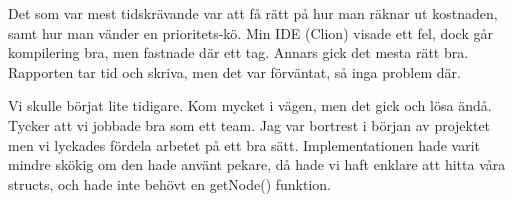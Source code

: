 \documentclass[fleqn,10pt]{article}
\begin{document}
Det som var mest tidskrävande var att få rätt på hur man räknar ut kostnaden, samt hur man vänder en prioritets-kö. Min IDE (Clion) visade ett fel, dock går kompilering bra, men fastnade där ett tag. Annars gick det mesta rätt bra. Rapporten tar tid och skriva, men det var förväntat, så inga problem där.

Vi skulle börjat lite tidigare. Kom mycket i vägen, men det gick och lösa ändå. Tycker att vi jobbade bra som ett team. Jag var bortrest i början av projektet men vi lyckades fördela arbetet på ett bra sätt. Implementationen hade varit mindre skökig om den hade använt pekare, då hade vi haft enklare att hitta våra structs, och hade inte behövt en getNode() funktion. 
\end{document}
